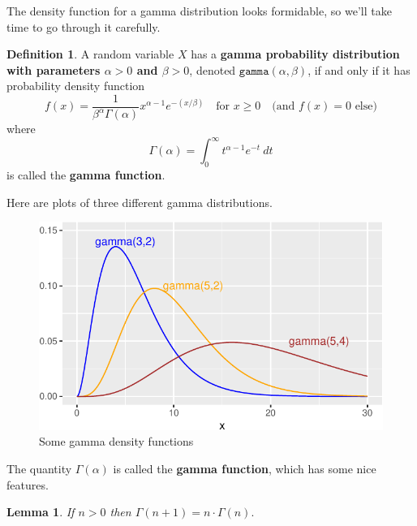 \documentclass[
]{book}
\newtheorem{lemma}{Lemma}[chapter]
\theoremstyle{definition}
\newtheorem{definition}{Definition}[chapter]
\theoremstyle{definition}
\theoremstyle{definition}
\theoremstyle{definition}
\theoremstyle{remark}
\begin{document}
The density function for a gamma distribution looks formidable, so we'll take time to go through it carefully.

\begin{definition}
\protect\hypertarget{def:gamma-distribution}{}\label{def:gamma-distribution}A random variable \(X\) has a \textbf{gamma probability distribution with parameters \(\alpha>0\) and \(\beta>0\)}, denoted \(\texttt{gamma}(\alpha,\beta)\), if and only if it has probability density function
\[
f(x)=
\frac{1}{\beta^\alpha \Gamma(\alpha)}x^{\alpha-1}e^{-(x/\beta)}~~~ \text{ for }x \geq 0~~~ \text{ (and }f(x) = 0\text{ else)}
\]
where \[\Gamma(\alpha) = \int_0^\infty t^{\alpha-1}e^{-t}~dt\] is called the \textbf{gamma function}.
\end{definition}

Here are plots of three different gamma distributions.

\begin{figure}
\centering
\includegraphics{math340-notes_files/figure-latex/gamma-plots-1.pdf}
\caption{\label{fig:gamma-plots}Some gamma density functions}
\end{figure}

The quantity \(\Gamma(\alpha)\) is called the \textbf{gamma function}, which has some nice features.

\begin{lemma}
\protect\hypertarget{lem:gamma-fcn-ind-step}{}\label{lem:gamma-fcn-ind-step}If \(n > 0\) then \(\Gamma(n+1) = n \cdot \Gamma(n).\)
\end{lemma}
\end{document}

